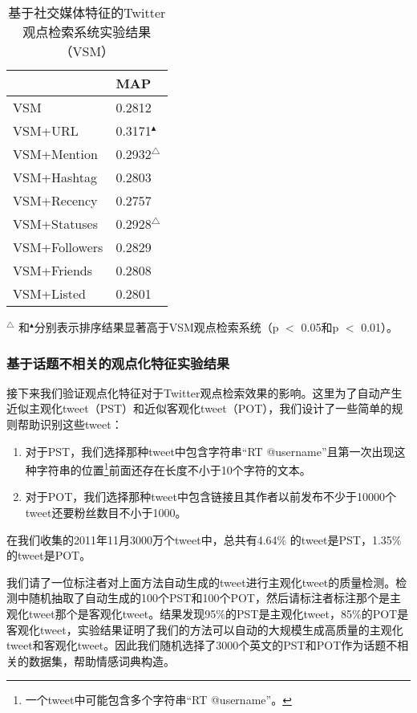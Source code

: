 \begin{table}
 \centering
  \caption{基于社交媒体特征的Twitter 观点检索系统实验结果（VSM）} \label{SocialVSM}
 \begin{tabular}{|l l|}
 \hline
 & MAP\\
 \hline
VSM &0.2812\\
 \hline
VSM+URL&0.3171$^\blacktriangle$\\
VSM+Mention&0.2932$^\triangle$\\
VSM+Hashtag&0.2803\\
VSM+Recency&0.2757\\
 \hline
VSM+Statuses&0.2928$^\triangle$\\
VSM+Followers&0.2829\\
VSM+Friends&0.2808\\
VSM+Listed&0.2801\\
 \hline
 \end{tabular}
    \begin{tablenotes}
        \footnotesize
\item $^\triangle$ 和$^\blacktriangle$分别表示排序结果显著高于VSM观点检索系统（p $<$ 0.05和p $<$ 0.01）。
\end{tablenotes}
\end{table}

\subsubsection{基于话题不相关的观点化特征实验结果}
\label{OFE}
接下来我们验证观点化特征对于Twitter观点检索效果的影响。这里为了自动产生近似主观化tweet（PST）和近似客观化tweet（POT），我们设计了一些简单的规则帮助识别这些tweet：

\begin{enumerate}
\item 对于PST，我们选择那种tweet中包含字符串“RT @username”且第一次出现这种字符串的位置\footnote{一个tweet中可能包含多个字符串“RT @username”。}前面还存在长度不小于10个字符的文本。
\item 对于POT，我们选择那种tweet中包含链接且其作者以前发布不少于10000个tweet还要粉丝数目不小于1000。
\end{enumerate}
在我们收集的2011年11月3000万个tweet中，总共有4.64\% 的tweet是PST，1.35\%的tweet是POT。

我们请了一位标注者对上面方法自动生成的tweet进行主观化tweet的质量检测。检测中随机抽取了自动生成的100个PST和100个POT，然后请标注者标注那个是主观化tweet那个是客观化tweet。结果发现95\%的PST是主观化tweet，85\%的POT是客观化tweet，实验结果证明了我们的方法可以自动的大规模生成高质量的主观化tweet和客观化tweet。因此我们随机选择了3000个英文的PST和POT作为话题不相关的数据集，帮助情感词典构造。
 
